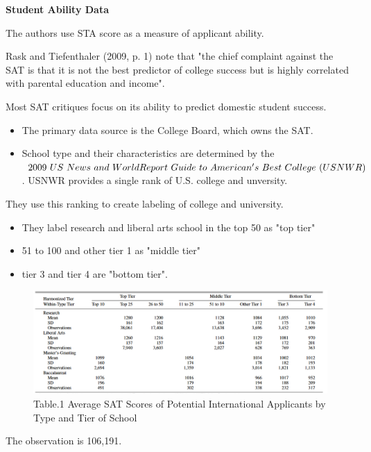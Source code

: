 \documentclass[../root]{subfiles}
\begin{document}
   {\bf Student Ability Data}
   
   The authors use STA score as a measure of applicant ability.
   
   Rask and Tiefenthaler (2009, p. 1) note that "the chief complaint against the SAT is that it is not the best predictor of college success but is highly correlated with parental education and income".
   
   Most SAT critiques focus on its ability to predict domestic student success.
   
   \begin{itemize}
       \item The primary data source is the College Board, which owns the SAT.
       \item School type and their characteristics are determined by the $2009 \ US \ News \ and \ World \ \\
       Report \ Guide \ to \ American's \ Best \ College \ (USNWR)$. USNWR provides a single rank of U.S. college and unversity.
   \end{itemize}
   
   They use this ranking to create labeling of college and university.
   \begin{itemize}
       \item They label research and liberal arts school in the top 50 as "top tier"
       \item 51 to 100 and other tier 1 as "middle tier"
       \item tier 3 and tier 4 are "bottom tier".
   \end{itemize}
   
   \begin{figure}
        \centering
        \includegraphics[width = \linewidth]{1016sugiyama/Table_1.png}
        \caption{Table.1 Average SAT Scores of Potential International Applicants by Type and Tier of School}
        \label{fig:my_label}
    \end{figure}
   
   The observation is 106,191.
   
\end{document}
